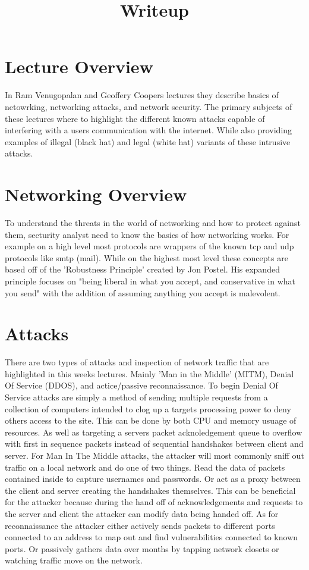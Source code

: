 \documentclass[letterpaper,12pt,titlepage,onecolumn]{IEEEtran}
\author{\name}
\title{Writeup}
\begin{document}
\maketitle
\hrulefill

\section{Lecture Overview}
In Ram Venugopalan and Geoffery Coopers lectures they describe basics of netowrking, networking attacks, and network security. The primary subjects of these lectures where to highlight the different known attacks capable of interfering with a users communication with the internet. While also providing examples of illegal (black hat) and legal (white hat) variants of these intrusive attacks. 
\section{Networking Overview}
To understand the threats in the world of networking and how to protect against them, secturity analyst need to know the basics of how networking works. For example on a high level most protocols are wrappers of the known tcp and udp protocols like smtp (mail). While on the highest most level these concepts are based off of the 'Robustness Principle' created by Jon Postel. His expanded principle focuses on "being liberal in what you accept, and conservative in what you send" with the addition of assuming anything you accept is malevolent. 

\section{Attacks}
There are two types of attacks and inspection of network traffic that are highlighted in this weeks lectures. Mainly 'Man in the Middle' (MITM), Denial Of Service (DDOS), and actice/passive reconnaissance. To begin Denial Of Service attacks are simply a method of sending multiple requests from a collection of computers intended to clog up a targets processing power to deny others access to the site. This can be done by both CPU and memory usuage of resources. As well as targeting a servers packet acknoledgement queue to overflow with first in sequence packets instead of sequential handshakes between client and server. For Man In The Middle attacks, the attacker will most commonly sniff out traffic on a local network and do one of two things. Read the data of packets contained inside to capture usernames and passwords. Or act as a proxy between the client and server creating the handshakes themselves. This can be beneficial for the attacker because during the hand off of acknowledgements and requests to the server and client the attacker can modify data being handed off. As for reconnaissance the attacker either actively sends packets to different ports connected to an address to map out and find vulnerabilities connected to known ports. Or passively gathers data over months by tapping network closets or watching traffic move on the network.
\end{document}
